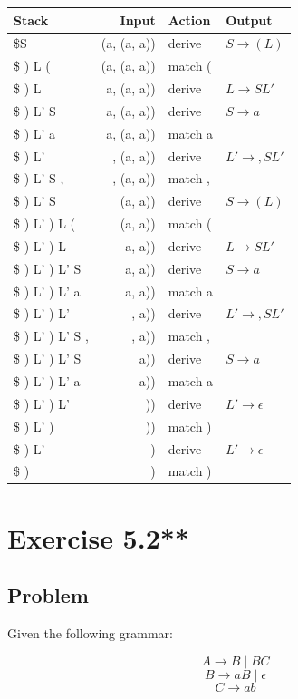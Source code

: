 \begin{table}[htbp]
\centering
\begin{tabular}{|l|r|l|l|}
\hline
Stack & Input & Action & Output \\\hline
\$S & (a, (a, a)) & derive & $S \to (L)$  \\
\$ ) L ( & (a, (a, a)) & match ( & \\
\$ ) L & a, (a, a)) & derive & $L \to SL'$ \\
\$ ) L' S & a, (a, a)) & derive & $S \to a$ \\
\$ ) L' a & a, (a, a)) & match a & \\
\$ ) L' & , (a, a)) & derive & $L' \to ,SL'$ \\
\$ ) L' S , & , (a, a)) & match , & \\
\$ ) L' S & (a, a)) & derive & $S \to (L)$  \\
\$ ) L' ) L ( & (a, a)) & match ( & \\
\$ ) L' ) L & a, a)) & derive & $L \to SL'$ \\
\$ ) L' ) L' S & a, a)) & derive & $S \to a$ \\
\$ ) L' ) L' a & a, a)) & match a & \\
\$ ) L' ) L' & , a)) & derive & $L' \to ,SL'$ \\
\$ ) L' ) L' S , & , a)) & match , & \\
\$ ) L' ) L' S & a)) & derive & $S \to a$ \\
\$ ) L' ) L' a & a)) & match a & \\
\$ ) L' ) L' & )) & derive & $L' \to \epsilon$ \\
\$ ) L' ) & )) & match ) & \\
\$ ) L' & ) & derive & $L' \to \epsilon$  \\
\$ ) & ) & match ) & \\\hline
\end{tabular}
\end{table}

\chapter{Exercise 5.2**}

\section{Problem}

Given the following grammar:

\[
A \to B \;|\; BC
\]
\[
B \to a B \;|\; \epsilon
\]
\[
C \to a b
\]

